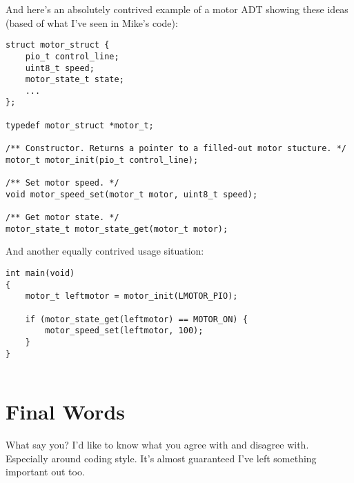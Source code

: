\documentclass[10pt]{article}
\begin{document}
\noindent And here's an absolutely contrived example of a motor ADT showing these ideas (based of what I've seen in Mike's code):
\begin{lstlisting}[frame=single]
struct motor_struct {
	pio_t control_line;
	uint8_t speed;
	motor_state_t state;
	...
};

typedef motor_struct *motor_t;

/** Constructor. Returns a pointer to a filled-out motor stucture. */
motor_t motor_init(pio_t control_line);

/** Set motor speed. */
void motor_speed_set(motor_t motor, uint8_t speed);

/** Get motor state. */
motor_state_t motor_state_get(motor_t motor);
\end{lstlisting}
\noindent And another equally contrived usage situation:
\begin{lstlisting}[frame=single]
int main(void)
{
	motor_t leftmotor = motor_init(LMOTOR_PIO);
	
	if (motor_state_get(leftmotor) == MOTOR_ON) {
		motor_speed_set(leftmotor, 100);
	}
}
	
\end{lstlisting}

\section{Final Words}
What say you? I'd like to know what you agree with and disagree with. Especially around coding style. It's almost guaranteed I've left something important out too.
\end{document}

